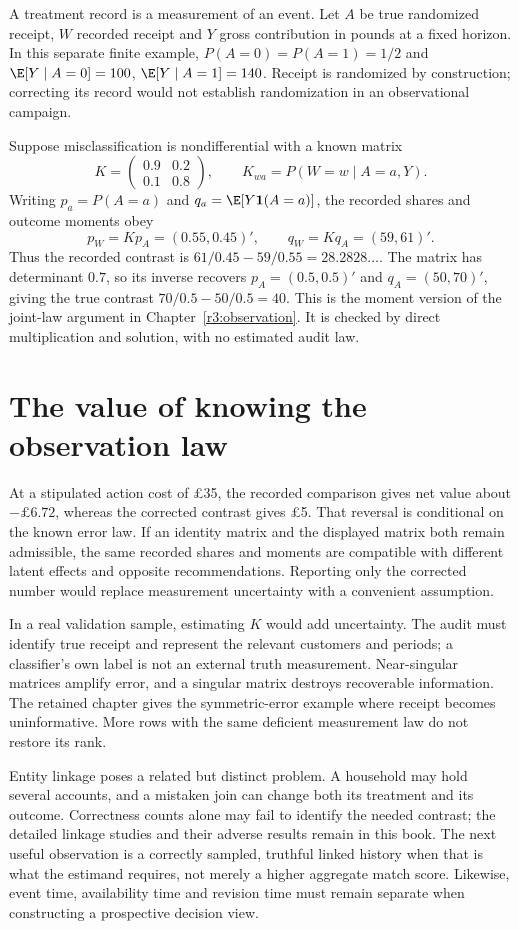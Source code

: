 A treatment record is a measurement of an event. Let $A$ be true randomized
receipt, $W$ recorded receipt and $Y$ gross contribution in pounds at a
fixed horizon. In this separate finite example, $P(A=0)=P(A=1)=1/2$
and $\E[Y\mid A=0]=100$, $\E[Y\mid A=1]=140$. Receipt is
randomized by construction; correcting its record would not establish
randomization in an observational campaign.

Suppose misclassification is nondifferential with a known matrix
\[
 K=\begin{pmatrix}0.9&0.2\\0.1&0.8\end{pmatrix},
 \qquad K_{wa}=P(W=w\mid A=a,Y).
\]
Writing $p_a=P(A=a)$ and $q_a=\E[Y\mathbf1(A=a)]$, the recorded
shares and outcome moments obey
\[
 p_W=Kp_A=(0.55,0.45)' ,\qquad q_W=Kq_A=(59,61)' .
\]
Thus the recorded contrast is $61/0.45-59/0.55=28.2828\ldots$.
The matrix has determinant $0.7$, so its inverse recovers
$p_A=(0.5,0.5)'$ and $q_A=(50,70)'$, giving the true contrast
$70/0.5-50/0.5=40$. This is the moment version of the joint-law
argument in Chapter~\ref{r3:observation}. It is checked by direct
multiplication and solution, with no estimated audit law.

\section{The value of knowing the observation law}
At a stipulated action cost of \pounds35, the recorded comparison gives
net value about $-\pounds6.72$, whereas the corrected contrast gives
\pounds5. That reversal is conditional on the known error law. If an
identity matrix and the displayed matrix both remain admissible, the same
recorded shares and moments are compatible with different latent effects
and opposite recommendations. Reporting only the corrected number would
replace measurement uncertainty with a convenient assumption.

In a real validation sample, estimating $K$ would add uncertainty. The audit
must identify true receipt and represent the relevant customers and periods;
a classifier's own label is not an external truth measurement. Near-singular
matrices amplify error, and a singular matrix destroys recoverable information.
The retained chapter gives the symmetric-error example where receipt becomes
uninformative. More rows with the same deficient measurement law do not
restore its rank.

Entity linkage poses a related but distinct problem. A household may hold
several accounts, and a mistaken join can change both its treatment and its
outcome. Correctness counts alone may fail to identify the needed contrast;
the detailed linkage studies and their adverse results remain in this book.
The next useful observation is a correctly sampled, truthful linked history
when that is what the estimand requires, not merely a higher aggregate match
score. Likewise, event time, availability time and revision time must remain
separate when constructing a prospective decision view.

